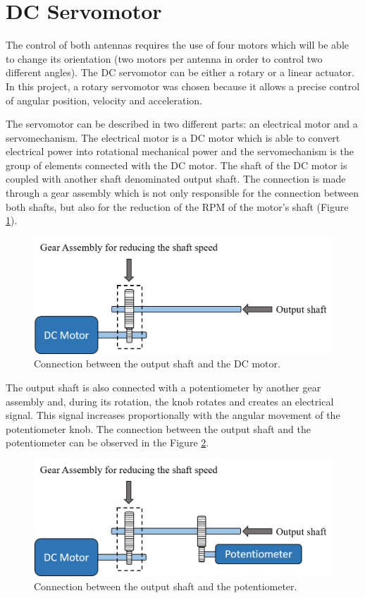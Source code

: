 \section{DC Servomotor}\label{sec:servo_motor}

The control of both antennas requires the use of four motors which will be able to change its orientation (two motors per antenna in order to control two different angles). The DC servomotor can be either a rotary or a linear actuator. In this project, a rotary servomotor was chosen because it allows a precise control of angular position, velocity and acceleration.

The servomotor can be described in two different parts: an electrical motor and a servomechanism. The electrical motor is a DC motor which is able to convert electrical power into rotational mechanical power and the servomechanism is the group of elements connected with the DC motor. The shaft of the DC motor is coupled with another shaft denominated output shaft. The connection is made through a gear assembly which is not only responsible for the connection between both shafts, but also for the reduction of the RPM of the motor’s shaft (Figure \ref{servomotor_expl1}).

\begin{figure}[H]
\centering
\includegraphics[scale=0.7]{figures/servomotor_expl1.png}
\caption{Connection between the output shaft and the DC motor.}
\label{servomotor_expl1}
\end{figure}

The output shaft is also connected with a potentiometer by another gear assembly and, during its rotation, the knob rotates and creates an electrical signal. This signal increases proportionally with the angular movement of the potentiometer knob. The connection between the output shaft and the potentiometer can be
observed in the Figure \ref{servomotor_expl2}.

\begin{figure}[H]
\centering
\includegraphics[scale=0.61]{figures/servomotor_expl2.png}
\caption{Connection between the output shaft and the potentiometer.}
\label{servomotor_expl2}
\end{figure}

